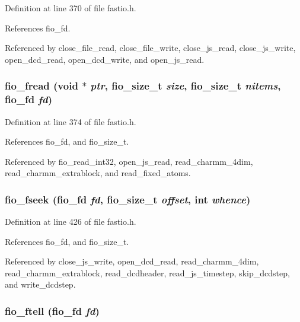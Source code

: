 Definition at line 370 of file fastio.h.

References fio\_\-fd.

Referenced by close\_\-file\_\-read, close\_\-file\_\-write, close\_\-js\_\-read, close\_\-js\_\-write, open\_\-dcd\_\-read, open\_\-dcd\_\-write, and open\_\-js\_\-read.
\subsubsection{ fio\_\-fread (void $\ast$ {\em ptr}, {\bf fio\_\-size\_\-t} {\em size}, {\bf fio\_\-size\_\-t} {\em nitems}, {\bf fio\_\-fd} {\em fd})\hspace{0.3cm}{\tt  [static]}}\label{fastio_8h_a10}




Definition at line 374 of file fastio.h.

References fio\_\-fd, and fio\_\-size\_\-t.

Referenced by fio\_\-read\_\-int32, open\_\-js\_\-read, read\_\-charmm\_\-4dim, read\_\-charmm\_\-extrablock, and read\_\-fixed\_\-atoms.
\subsubsection{ fio\_\-fseek ({\bf fio\_\-fd} {\em fd}, {\bf fio\_\-size\_\-t} {\em offset}, int {\em whence})\hspace{0.3cm}{\tt  [static]}}\label{fastio_8h_a13}




Definition at line 426 of file fastio.h.

References fio\_\-fd, and fio\_\-size\_\-t.

Referenced by close\_\-js\_\-write, open\_\-dcd\_\-read, read\_\-charmm\_\-4dim, read\_\-charmm\_\-extrablock, read\_\-dcdheader, read\_\-js\_\-timestep, skip\_\-dcdstep, and write\_\-dcdstep.
\subsubsection{ fio\_\-ftell ({\bf fio\_\-fd} {\em fd})\hspace{0.3cm}{\tt  [static]}}\label{fastio_8h_a14}




